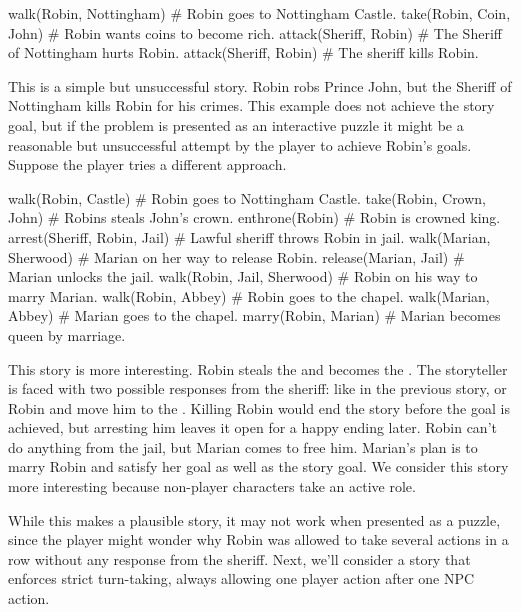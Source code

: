 \documentclass{nilreport}
\begin{document}
\begin{code}
walk(Robin, Nottingham) # Robin goes to Nottingham Castle.
take(Robin, Coin, John) # Robin wants coins to become rich.
attack(Sheriff, Robin)  # The Sheriff of Nottingham hurts Robin.
attack(Sheriff, Robin)  # The sheriff kills Robin.
\end{code}

This is a simple but unsuccessful story. Robin robs Prince John, but the Sheriff of Nottingham kills Robin for his crimes. This example does not achieve the story goal, but if the problem is presented as an interactive puzzle it might be a reasonable but unsuccessful attempt by the player to achieve Robin's goals. Suppose the player tries a different approach.

\begin{code}
walk(Robin, Castle)          # Robin goes to Nottingham Castle.
take(Robin, Crown, John)     # Robins steals John's crown.
enthrone(Robin)              # Robin is crowned king.
arrest(Sheriff, Robin, Jail) # Lawful sheriff throws Robin in jail.
walk(Marian, Sherwood)       # Marian on her way to release Robin.
release(Marian, Jail)        # Marian unlocks the jail.
walk(Robin, Jail, Sherwood)  # Robin on his way to marry Marian.
walk(Robin, Abbey)           # Robin goes to the chapel.
walk(Marian, Abbey)          # Marian goes to the chapel.
marry(Robin, Marian)         # Marian becomes queen by marriage.
\end{code}

This story is more interesting. Robin steals the  and becomes the . The storyteller is faced with two possible responses from the sheriff:  like in the previous story, or  Robin and move him to the . Killing Robin would end the story before the goal is achieved, but arresting him leaves it open for a happy ending later. Robin can't do anything from the jail, but Marian comes to free him. Marian's plan is to marry Robin and satisfy her  goal as well as the story goal. We consider this story more interesting because non-player characters take an active role.

While this makes a plausible story, it may not work when presented as a puzzle, since the player might wonder why Robin was allowed to take several actions in a row without any response from the sheriff. Next, we'll consider a story that enforces strict turn-taking, always allowing one player action after one NPC action.
\end{document}
